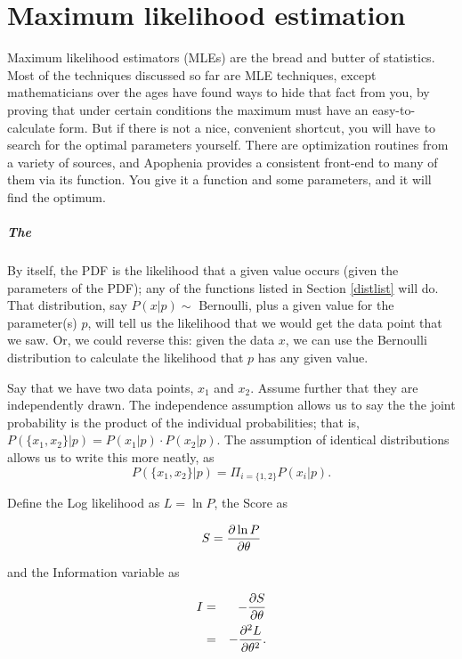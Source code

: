 \chapter{Maximum likelihood estimation} \label{mle}

Maximum likelihood estimators (MLEs) are the bread and butter of
statistics.  Most of the techniques discussed so far are MLE
techniques, except mathematicians over the ages have found ways to hide
that fact from you, by proving that under certain conditions the
maximum must have an easy-to-calculate form. But if there is not a nice,
convenient shortcut, you will have to search for the optimal parameters
yourself. There are optimization routines from a variety of sources,
and Apophenia provides a consistent front-end to many of them via its
 function. You give it a function and
some parameters, and it will find the optimum.

\paragraph{The }	\label{the score}
By itself, the PDF is the likelihood that a given value occurs (given
the parameters of the PDF); any of the functions listed in Section
\ref{distlist} will do. That distribution, say $P(x|p)\sim$ Bernoulli,
plus a given value for the parameter(s) $p$, will tell us the likelihood
that we would get the data point that we saw. Or, we could reverse this:
given the data $x$, we can use the Bernoulli distribution to calculate the
likelihood that $p$ has any given value.

Say that we have two data points, $x_1$ and $x_2$. Assume further that
they are independently drawn.  The independence assumption allows us
to say the the joint probability is the product of the individual
probabilities; that is, $P(\{x_1,x_2\}|p)=P(x_1|p)\cdot P(x_2|p)$.
The assumption of identical distributions allows us to write this more
neatly, as $$P(\{x_1,x_2\}|p)=\Pi_{i=\{1,2\}}P(x_i|p).$$

Define the Log likelihood as $L=\ln P$, the Score as

$$S={\partial \ln P\over \partial \theta}$$ 

and the Information variable as

\begin{eqnarray}
I&=&-{\partial S \over \partial \theta}			\nonumber\\
&=&-{\partial^2 L \over \partial \theta^2}.		\nonumber
\end{eqnarray}

